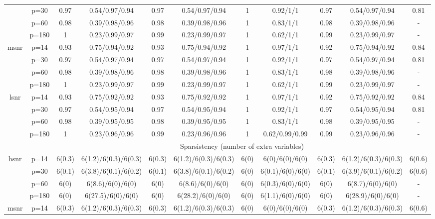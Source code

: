 \begin{table}[ht]
{\begin{tabular}{|c|c|cc|cc|cc|cc|c|}
   & p=30 & 0.97 & 0.54/0.97/0.94 & 0.97 & 0.54/0.97/0.94 & 1 & 0.92/1/1 & 0.97 & 0.54/0.97/0.94 & 0.81 \\ 
   & p=60 & 0.98 & 0.39/0.98/0.96 & 0.98 & 0.39/0.98/0.96 & 1 & 0.83/1/1 & 0.98 & 0.39/0.98/0.96 & - \\ 
   & p=180 & 1 & 0.23/0.99/0.97 & 0.99 & 0.23/0.99/0.97 & 1 & 0.62/1/1 & 0.99 & 0.23/0.99/0.97 & - \\ 
  \midrule\multirow{4}[2]{*}{msnr} & p=14 & 0.93 & 0.75/0.94/0.92 & 0.93 & 0.75/0.94/0.92 & 1 & 0.97/1/1 & 0.92 & 0.75/0.94/0.92 & 0.84 \\ 
   & p=30 & 0.97 & 0.54/0.97/0.94 & 0.97 & 0.54/0.97/0.94 & 1 & 0.92/1/1 & 0.97 & 0.54/0.97/0.94 & 0.81 \\ 
   & p=60 & 0.98 & 0.39/0.98/0.96 & 0.98 & 0.39/0.98/0.96 & 1 & 0.83/1/1 & 0.98 & 0.39/0.98/0.96 & - \\ 
   & p=180 & 1 & 0.23/0.99/0.97 & 0.99 & 0.23/0.99/0.97 & 1 & 0.62/1/1 & 0.99 & 0.23/0.99/0.97 & - \\ 
  \midrule\multirow{4}[2]{*}{lsnr} & p=14 & 0.93 & 0.75/0.92/0.92 & 0.93 & 0.75/0.92/0.92 & 1 & 0.97/1/1 & 0.92 & 0.75/0.92/0.92 & 0.84 \\ 
   & p=30 & 0.97 & 0.54/0.95/0.94 & 0.97 & 0.54/0.95/0.94 & 1 & 0.92/1/1 & 0.97 & 0.54/0.95/0.94 & 0.81 \\ 
   & p=60 & 0.98 & 0.39/0.95/0.95 & 0.98 & 0.39/0.95/0.95 & 1 & 0.83/1/1 & 0.98 & 0.39/0.95/0.95 & - \\ 
   & p=180 & 1 & 0.23/0.96/0.96 & 0.99 & 0.23/0.96/0.96 & 1 & 0.62/0.99/0.99 & 0.99 & 0.23/0.96/0.96 & - \\ 
   \midrule 
 \multicolumn{1}{|c}{} &       & \multicolumn{9}{c|}{Sparsistency (number of extra variables)} \\
\midrule\multirow{4}[2]{*}{hsnr} & p=14 & 6(0.3) & 6(1.2)/6(0.3)/6(0.3) & 6(0.3) & 6(1.2)/6(0.3)/6(0.3) & 6(0) & 6(0)/6(0)/6(0) & 6(0.3) & 6(1.2)/6(0.3)/6(0.3) & 6(0.6) \\ 
   & p=30 & 6(0.1) & 6(3.8)/6(0.1)/6(0.2) & 6(0.1) & 6(3.8)/6(0.1)/6(0.2) & 6(0) & 6(0.1)/6(0)/6(0) & 6(0.1) & 6(3.9)/6(0.1)/6(0.2) & 6(0.6) \\ 
   & p=60 & 6(0) & 6(8.6)/6(0)/6(0) & 6(0) & 6(8.6)/6(0)/6(0) & 6(0) & 6(0.3)/6(0)/6(0) & 6(0) & 6(8.7)/6(0)/6(0) & - \\ 
   & p=180 & 6(0) & 6(27.5)/6(0)/6(0) & 6(0) & 6(28.2)/6(0)/6(0) & 6(0) & 6(1.1)/6(0)/6(0) & 6(0) & 6(28.9)/6(0)/6(0) & - \\ 
  \midrule\multirow{4}[2]{*}{msnr} & p=14 & 6(0.3) & 6(1.2)/6(0.3)/6(0.3) & 6(0.3) & 6(1.2)/6(0.3)/6(0.3) & 6(0) & 6(0)/6(0)/6(0) & 6(0.3) & 6(1.2)/6(0.3)/6(0.3) & 6(0.6) \\ 

\end{tabular}}
\end{table}
